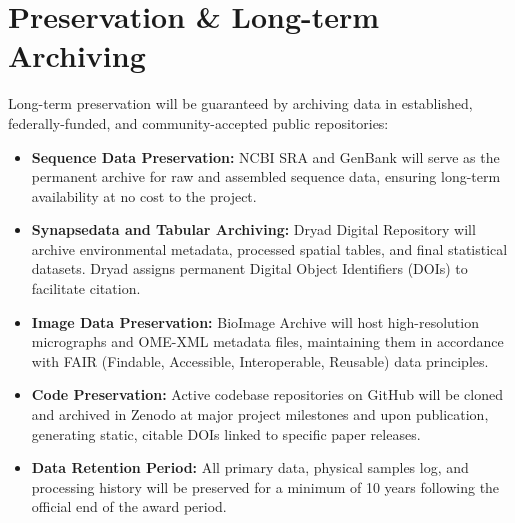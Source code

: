 \section{Preservation \& Long-term Archiving}
Long-term preservation will be guaranteed by archiving data in established, federally-funded, and community-accepted public repositories:
\begin{itemize}
    \item \textbf{Sequence Data Preservation:} NCBI SRA and GenBank will serve as the permanent archive for raw and assembled sequence data, ensuring long-term availability at no cost to the project.
    \item \textbf{Synapsedata and Tabular Archiving:} Dryad Digital Repository will archive environmental metadata, processed spatial tables, and final statistical datasets. Dryad assigns permanent Digital Object Identifiers (DOIs) to facilitate citation.
    \item \textbf{Image Data Preservation:} BioImage Archive will host high-resolution micrographs and OME-XML metadata files, maintaining them in accordance with FAIR (Findable, Accessible, Interoperable, Reusable) data principles.
    \item \textbf{Code Preservation:} Active codebase repositories on GitHub will be cloned and archived in Zenodo at major project milestones and upon publication, generating static, citable DOIs linked to specific paper releases.
    \item \textbf{Data Retention Period:} All primary data, physical samples log, and processing history will be preserved for a minimum of 10 years following the official end of the award period.
\end{itemize}
